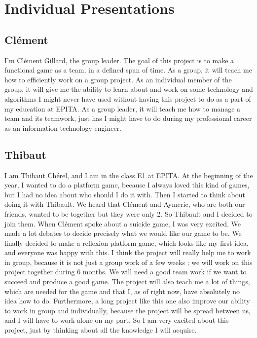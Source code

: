 \chapter{Individual Presentations}

	\section{Clément}

		I'm Clément Gillard, the group leader. The goal of this project is to make a functional game as a team,
		in a defined span of time. As a group, it will teach me how to efficiently work on a group project.
		As an individual member of the group, it will give me the ability to learn about
		and work on some technology and algorithms I might never have used without having this project
		to do as a part of my education at EPITA. As a group leader, it will teach me how to manage a team
		and its teamwork, just has I might have to do during my professional career as
		an information technology engineer.

	\section{Thibaut}

		I am Thibaut Chérel, and I am in the class E1 at EPITA. At the beginning of the year,
		I wanted to do a platform game, because I always loved this kind of games,
		but I had no idea about who should I do it with. Then I started to think about doing it with Thibault.
		We heard that Clément and Aymeric, who are both our friends, wanted to be together but they were only 2.
		So Thibault and I decided to join them. When Clément spoke about a suicide game, I was very excited.
		We made a lot debates to decide precisely what we would like our game to be.
		We finally decided to make a reflexion platform game, which looks like my first idea,
		and everyone was happy with this. I think the project will really help me to work in group,
		because it is not just a group work of a few weeks ; we will work on this project together during 6 months.
		We will need a good team work if we want to succeed and produce a good game.
		The project will also teach me a lot of things, which are needed for the game and that I, as of right now,
		have absolutely no idea how to do. Furthermore, a long project like this one also improve our ability to work
		in group and individually, because the project will be spread between us,
		and I will have to work alone on my part. So I am very excited about this project,
		just by thinking about all the knowledge I will acquire.

